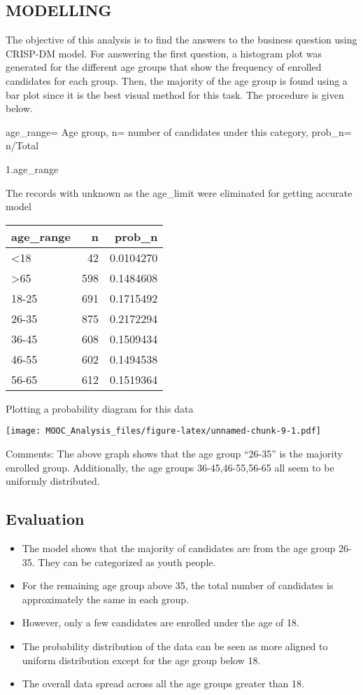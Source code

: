 \documentclass[
]{article}
\begin{document}
\hypertarget{modelling}{%
\subsection{MODELLING}\label{modelling}}

The objective of this analysis is to find the answers to the business
question using CRISP-DM model. For answering the first question, a
histogram plot was generated for the different age groups that show the
frequency of enrolled candidates for each group. Then, the majority of
the age group is found using a bar plot since it is the best visual
method for this task. The procedure is given below.

age\_range= Age group, n= number of candidates under this category,
prob\_n= n/Total

1.age\_range

The records with unknown as the age\_limit were eliminated for getting
accurate model

\begin{longtable}[]{@{}lrr@{}}
\toprule
age\_range & n & prob\_n \\
\midrule
\endhead
\textless18 & 42 & 0.0104270 \\
\textgreater65 & 598 & 0.1484608 \\
18-25 & 691 & 0.1715492 \\
26-35 & 875 & 0.2172294 \\
36-45 & 608 & 0.1509434 \\
46-55 & 602 & 0.1494538 \\
56-65 & 612 & 0.1519364 \\
\bottomrule
\end{longtable}

Plotting a probability diagram for this data

\texttt{[image: MOOC\_Analysis\_files/figure-latex/unnamed-chunk-9-1.pdf]}

Comments: The above graph shows that the age group ``26-35'' is the
majority enrolled group. Additionally, the age groups 36-45,46-55,56-65
all seem to be uniformly distributed.

\hypertarget{evaluation-1}{%
\subsection{Evaluation}\label{evaluation-1}}

\begin{itemize}
\item
  The model shows that the majority of candidates are from the age group
  26-35. They can be categorized as youth people.
\item
  For the remaining age group above 35, the total number of candidates
  is approximately the same in each group.
\item
  However, only a few candidates are enrolled under the age of 18.
\item
  The probability distribution of the data can be seen as more aligned
  to uniform distribution except for the age group below 18.
\item
  The overall data spread across all the age groups greater than 18.
\end{itemize}
\end{document}
